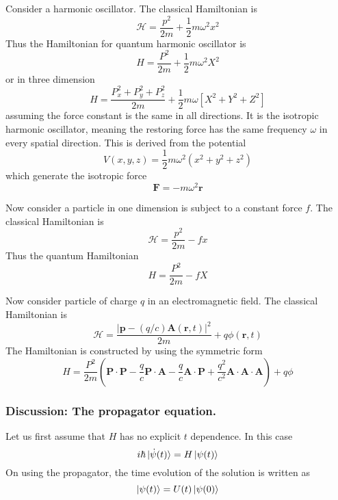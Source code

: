 \documentclass[../../../main.tex]{subfiles}
\begin{document}
Consider a harmonic oscillator.
The classical Hamiltonian is 
\begin{equation*}
    \mathcal{H }=\frac{p^2 }{2m }+\frac{1 }{2 }m\omega^2x^2
\end{equation*}
Thus the Hamiltonian for quantum harmonic oscillator is 
\begin{equation*}
    H=\frac{P^2 }{2m }+\frac{1 }{2 }m\omega^2X^2
\end{equation*}
or in three dimension
\begin{equation*}
    H=\frac{P_x^2+P_y^2+P_z^2}{2m  }+\frac{1 }{2}m\omega \left[ X^2+Y^2+Z^2 \right] 
\end{equation*}
assuming the force constant is the same in all directions.
It is the isotropic harmonic oscillator, meaning the restoring force has the same frequency $\omega$ in every spatial direction.
This is derived from the potential
\begin{equation*}
    V(x,y,z) = \frac{1}{2} m \omega^2 (x^2 + y^2 + z^2)
\end{equation*}
which generate the isotropic force 
\begin{equation*}
    \mathbf{F }= -m \omega^2 \mathbf{r}
\end{equation*}

Now consider a particle in one dimension is subject to a constant force $f$.
The classical Hamiltonian is 
\begin{equation*}
    \mathcal{H }=\frac{p^2 }{2m }-fx
\end{equation*}
Thus the quantum Hamiltonian  
\begin{equation*}
    H=\frac{P^2 }{2m }-fX
\end{equation*}

Now consider particle of charge $q$ in an electromagnetic field.
The classical Hamiltonian is 
\begin{equation*}
    \mathcal{H }=\frac{|\mathbf{p }-(q/c) \mathbf{A}(\mathbf{r},t)|^2 }{2m }+q\phi(\mathbf{r },t)
\end{equation*}
The Hamiltonian is constructed by using the symmetric form 
\begin{equation*}
    H=\frac{P^2 }{2m }\left( \mathbf{P }\cdot \mathbf{P }-\frac{q }{c }\mathbf{P }\cdot \mathbf{A}-\frac{q }{c}\mathbf{A}\cdot \mathbf{P}+\frac{q^2 }{c^2}\mathbf{A }\cdot \mathbf{A}\cdot \mathbf{A} \right) +q\phi
\end{equation*}

\subsubsection{Discussion: The propagator equation.}
Let us first assume that $H$ has no explicit $t$ dependence. In this case
\begin{equation*}
    i \hbar \ket{\dot{\psi}(t)}=H \ket{\psi(t)}
\end{equation*}
On using the propagator, the time evolution of the solution is written as 
\begin{equation*}
    \ket{\psi(t)}=U(t)\ket{\psi(0)}
\end{equation*}
\end{document}
